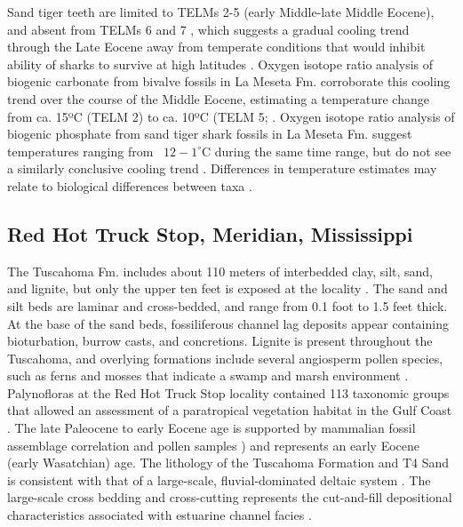 \documentclass[]{rsos}%
\begin{document}
Sand tiger  teeth are limited to TELMs 2-5 (early Middle-late Middle Eocene), and absent from TELMs 6 and 7 \cite{Long1992, Kriwet2016}, which suggests a gradual cooling trend through the Late Eocene away from temperate conditions that would inhibit ability of sharks to survive at high latitudes \cite{Kim2020}.
Oxygen isotope ratio analysis of biogenic carbonate from bivalve fossils in La Meseta Fm. corroborate this cooling trend over the course of the Middle Eocene, estimating a temperature change from ca. 15ºC (TELM 2) to ca. 10ºC (TELM 5; \cite{dutton2002stable, Ivany2008}. 
Oxygen isotope ratio analysis of biogenic phosphate from sand tiger shark fossils in La Meseta Fm. suggest temperatures ranging from ~$12-1^\circ$C  during the same time range, but do not see a similarly conclusive cooling trend \cite{Kim2020}.
Differences in temperature estimates may relate to biological differences between taxa \cite{Kim2020}.

\subsection{Red Hot Truck Stop, Meridian, Mississippi}
The Tuscahoma Fm. includes about 110 meters of interbedded clay, silt, sand, and lignite, but only the upper ten feet is exposed at the locality \cite{mancini1995geochronology, ingram1991tuscahoma} . 
The sand and silt beds are laminar and cross-bedded, and range from 0.1 foot to 1.5 feet thick. At the base of the sand beds, fossiliferous channel lag deposits appear containing bioturbation, burrow casts, and concretions. 
Lignite is present throughout the Tuscahoma, and overlying formations include several angiosperm pollen species, such as ferns and mosses that indicate a swamp and marsh environment \cite{mancini1995geochronology}.
Palynofloras at the Red Hot Truck Stop locality contained 113 taxonomic groups that allowed an assessment of a paratropical vegetation habitat in the Gulf Coast \cite{Harrington2003}.
The late Paleocene to early Eocene age is supported by mammalian fossil assemblage correlation \cite{Beard2009} and pollen samples \cite{frederiksen1998upper, Harrington2003}) and represents an early Eocene (early Wasatchian) age. 
The lithology of the Tuscahoma Formation and T4 Sand is consistent with that of a large-scale, fluvial-dominated deltaic system \cite{Beard2009}. 
The large-scale cross bedding and cross-cutting represents the cut-and-fill depositional characteristics associated with estuarine channel facies \cite{ingram1991tuscahoma}. 
\end{document}
